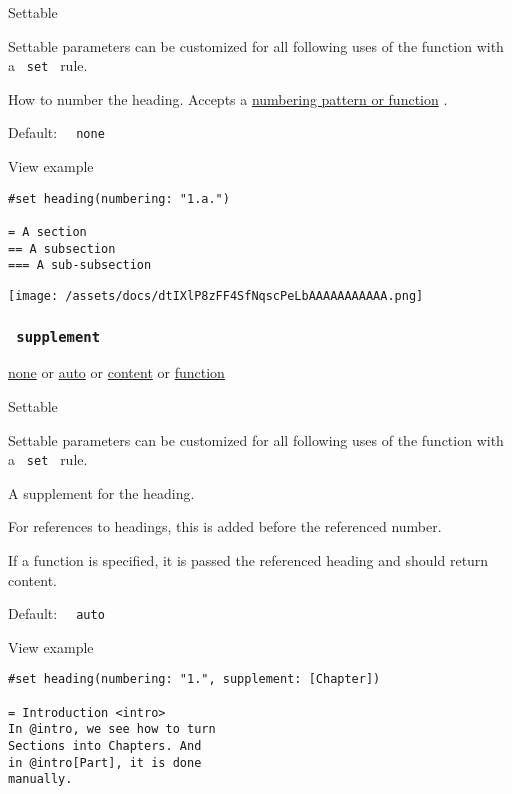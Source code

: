 {{ Settable }}

\label{parameters-numbering-settable-tooltip}
Settable parameters can be customized for all following uses of the
function with a \texttt{\ set\ } rule.

How to number the heading. Accepts a
\href{/docs/reference/model/numbering/}{numbering pattern or function} .

Default: \texttt{\ }{\texttt{\ none\ }}\texttt{\ }


View example

\begin{verbatim}
#set heading(numbering: "1.a.")

= A section
== A subsection
=== A sub-subsection
\end{verbatim}

\texttt{[image: /assets/docs/dtIXlP8zFF4SfNqscPeLbAAAAAAAAAAA.png]}

\subsubsection{\texorpdfstring{\texttt{\ supplement\ }}{ supplement }}\label{parameters-supplement}

\href{/docs/reference/foundations/none/}{none} {or}
\href{/docs/reference/foundations/auto/}{auto} {or}
\href{/docs/reference/foundations/content/}{content} {or}
\href{/docs/reference/foundations/function/}{function}

{{ Settable }}

\label{parameters-supplement-settable-tooltip}
Settable parameters can be customized for all following uses of the
function with a \texttt{\ set\ } rule.

A supplement for the heading.

For references to headings, this is added before the referenced number.

If a function is specified, it is passed the referenced heading and
should return content.

Default: \texttt{\ }{\texttt{\ auto\ }}\texttt{\ }


View example

\begin{verbatim}
#set heading(numbering: "1.", supplement: [Chapter])

= Introduction <intro>
In @intro, we see how to turn
Sections into Chapters. And
in @intro[Part], it is done
manually.
\end{verbatim}

